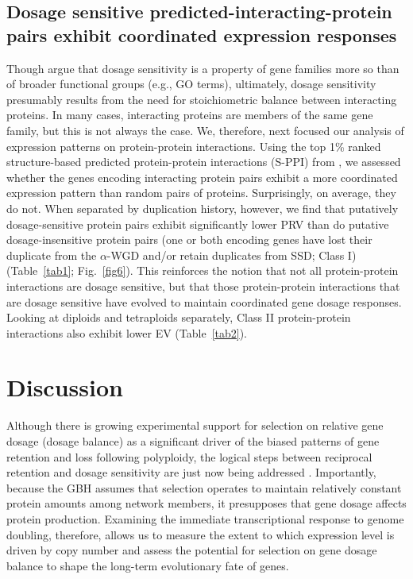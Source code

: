 \documentclass[11pt]{article}
\begin{document}
\subsection*{Dosage sensitive predicted-interacting-protein pairs exhibit coordinated expression responses}
Though \cite{tasdighian2017} argue that dosage sensitivity is a property of gene families more so than of broader functional groups (e.g., GO terms), ultimately, dosage sensitivity presumably results from the need for stoichiometric balance between interacting proteins.
In many cases, interacting proteins are members of the same gene family, but this is not always the case.
We, therefore, next focused our analysis of expression patterns on protein-protein interactions.
Using the top 1\% ranked structure-based predicted protein-protein interactions (S-PPI) from \cite{dong2019}, we assessed whether the genes encoding interacting protein pairs exhibit a more coordinated expression pattern than random pairs of proteins.
Surprisingly, on average, they do not.
When separated by duplication history, however, we find that putatively dosage-sensitive protein pairs exhibit significantly lower PRV than do putative dosage-insensitive protein pairs (one or both encoding genes have lost their duplicate from the $\alpha$-WGD and/or retain duplicates from SSD; Class I) (Table~\ref{tab1}; Fig.~\ref{fig6}).
This reinforces the notion that not all protein-protein interactions are dosage sensitive, but that those protein-protein interactions that are dosage sensitive have evolved to maintain coordinated gene dosage responses.
Looking at diploids and tetraploids separately, Class II protein-protein interactions also exhibit lower EV (Table~\ref{tab2}).\\

\section*{Discussion}
Although there is growing experimental support for selection on relative gene dosage (dosage balance) as a significant driver of the biased patterns of gene retention and loss following polyploidy, the logical steps between reciprocal retention and dosage sensitivity are just now being addressed \citep{tasdighian2017, coate2016}.
Importantly, because the GBH assumes that selection operates to maintain relatively constant protein amounts among network members, it presupposes that gene dosage affects protein production.
Examining the immediate transcriptional response to genome doubling, therefore, allows us to measure the extent to which expression level is driven by copy number and assess the potential for selection on gene dosage balance to shape the long-term evolutionary fate of genes.\\
\end{document}
